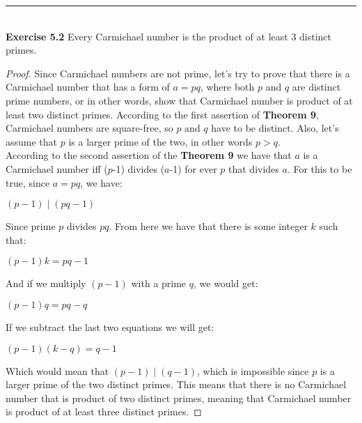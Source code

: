 \documentclass[a4paper]{article}
\begin{document}
\noindent\rule{12cm}{0.4pt}\\
\noindent \textbf{Exercise 5.2} Every Carmichael number is the product of at least 3 distinct primes.
\begin{proof}
Since Carmichael numbers are not prime, let's try to prove that there is a Carmichael number that has a form of $a=pq$, where both $p$ and $q$ are distinct prime numbers, or in other words, show that Carmichael number is product of at least two distinct primes. According to the first assertion of \textbf{Theorem 9}, Carmichael numbers are square-free, so $p$ and $q$ have to be distinct. Also, let's assume that $p$ is a larger prime of the two, in other words $p > q$.\\
According to the second assertion of the \textbf{Theorem 9} we have that $a$ is a Carmichael number iff ($p$-1) divides ($a$-1) for ever $p$ that divides $a$. For this to be true, since $a = pq$, we have:
\begin{center}
$(p-1) \mid (pq - 1)$
\end{center}
Since prime $p$ divides $pq$. From here we have that there is some integer $k$ such that:
\begin{center}
$(p-1)k = pq - 1$
\end{center}
And if we multiply $(p-1)$ with a prime $q$, we would get:
\begin{center}
$(p-1)q = pq - q$
\end{center}
If we subtract the last two equations we will get:
\begin{center}
$(p-1)(k-q) = q - 1$
\end{center}
Which would mean that $(p-1) \mid (q-1)$, which is impossible since $p$ is a larger prime of the two distinct primes. This means that there is no Carmichael number that is product of two distinct primes, meaning that Carmichael number is product of at least three distinct primes.
\end{proof}
\end{document}
